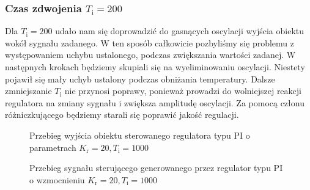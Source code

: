 \subsubsection{Czas zdwojenia $T_{\mathrm{i}} = \num{200}$} 
Dla $T_{\mathrm{i}} = \num{200}$ udało nam się doprowadzić do gasnących oscylacji wyjścia obiektu wokół sygnału zadanego. W ten sposób całkowicie pozbyliśmy się problemu z występowaniem uchybu ustalonego, podczas zwiększania wartości zadanej. W następnych krokach będziemy skupiali się na wyeliminowaniu oscylacji. Niestety pojawił się mały uchyb ustalony podczas obniżania temperatury. Dalsze zmniejszanie $T_{\mathrm{i}} $ nie przynosi poprawy, ponieważ prowadzi do wolniejszej reakcji regulatora na zmiany sygnału i zwiększa amplitudę oscylacji. Za pomocą członu różniczkującego będziemy starali się poprawić jakość regulacji. 

\begin{figure}[t]
    \centering
    \caption{Przebieg wyjścia obiektu sterowanego regulatora typu PI o parametrach $K_{\mathrm{r}} = \num{20}, T_{\mathrm{i}} = 1000$}
    \label{zad5_niegasnace_oscylacje_40_1000}
\end{figure}

\begin{figure}[b]
    \centering
    \caption{Przebieg sygnału sterującego generowanego przez regulator typu PI o wzmocnieniu $K_{\mathrm{r}} = \num{20}, T_{\mathrm{i}} = 1000$}
    \label{zad5_niegasnace_oscylacje_ster_40_1000}
\end{figure}
\FloatBarrier

